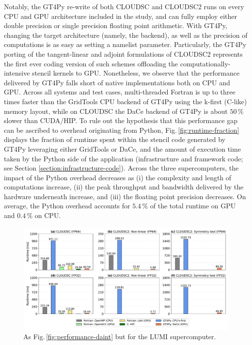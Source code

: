 \documentclass[main.tex]{subfiles}
\begin{document}
    \noindent Notably, the GT4Py re-write of both CLOUDSC and CLOUDSC2 runs on every CPU and GPU architecture included in the study, and can fully employ either double precision or single precision floating point arithmetic. With GT4Py, changing the target architecture (namely, the backend), as well as the precision of computations is as easy as setting a namelist parameter. Particularly, the GT4Py porting of the tangent-linear and adjoint formulations of CLOUDSC2 represents the first ever coding version of such schemes offloading the computationally-intensive stencil kernels to GPU. Nonetheless, we observe that the performance delivered by GT4Py falls short of native implementations both on CPU and GPU. Across all systems and test cases, multi-threaded Fortran is up to three times faster than the GridTools CPU backend of GT4Py using the k-first (C-like) memory layout, while on CLOUDSC the DaCe backend of GT4Py is about $50\,\%$ slower than CUDA/HIP. To rule out the hypothesis that this performance gap can be ascribed to overhead originating from Python, Fig.\,\ref{fig:runtime-fraction} displays the fraction of runtime spent within the stencil code generated by GT4Py leveraging either GridTools or DaCe, and the amount of execution time taken by the Python side of the application (infrastructure and framework code; see Section \ref{section:infrastructure-code}). Across the three supercomputers, the impact of the Python overhead decreases as (i) the complexity and length of computations increase, (ii) the peak throughput and bandwidth delivered by the hardware underneath increase, and (iii) the floating point precision decreases. On average, the Python overhead accounts for $5.4\,\%$ of the total runtime on GPU and $0.4\,\%$ on CPU.

    \begin{figure}[t!]
        \centering
        \includegraphics[scale=0.44]{img/performance_lumi_2.pdf}
        \caption{As Fig.\,\ref{fig:performance-daint} but for the LUMI supercomputer.}
        \label{fig:performance-lumi}
    \end{figure}
\end{document}
